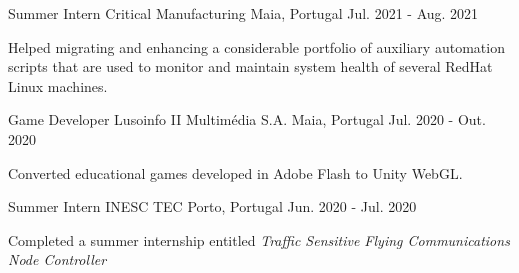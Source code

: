 
\begin{cventries}

\cventry
    {Summer Intern}   
    {Critical Manufacturing}   
    {Maia, Portugal}        
    {Jul. 2021 - Aug. 2021} 
    {
      \begin{cvitems}
        \item {Helped migrating and enhancing a considerable portfolio of auxiliary automation scripts that are used to monitor and maintain system health of several RedHat Linux machines.}
      \end{cvitems}
    }

  \cventry
    {Game Developer}   
    {Lusoinfo II Multimédia S.A.}   
    {Maia, Portugal}        
    {Jul. 2020 - Out. 2020} 
    {
      \begin{cvitems}
        \item {Converted educational games developed in Adobe Flash to Unity WebGL.}
      \end{cvitems}
    }

  \cventry
    {Summer Intern} 
    {INESC TEC} 
    {Porto, Portugal} 
    {Jun. 2020 - Jul. 2020} 
    {
      \begin{cvitems}
        \item {Completed a summer internship entitled \textit{Traffic Sensitive Flying Communications Node Controller}
        }
      \end{cvitems}
    }
\end{cventries}
